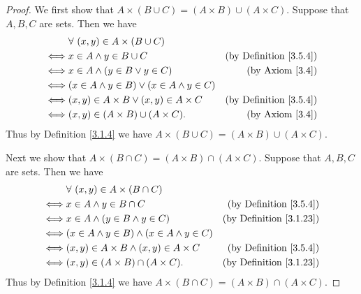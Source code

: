 \begin{proof}
    We first show that \(A \times (B \cup C) = (A \times B) \cup (A \times C)\).
    Suppose that \(A, B, C\) are sets.
    Then we have
    \begin{align*}
             & \forall\ (x, y) \in A \times (B \cup C)                                                   \\
        \iff & x \in A \land y \in B \cup C                         & \text{(by Definition \ref{3.5.4})} \\
        \iff & x \in A \land (y \in B \lor y \in C)                 & \text{(by Axiom \ref{3.4})}        \\
        \iff & (x \in A \land y \in B) \lor (x \in A \land y \in C)                                      \\
        \iff & (x, y) \in A \times B \lor (x, y) \in A \times C     & \text{(by Definition \ref{3.5.4})} \\
        \iff & (x, y) \in (A \times B) \cup (A \times C).           & \text{(by Axiom \ref{3.4})}
    \end{align*}
    Thus by Definition \ref{3.1.4} we have \(A \times (B \cup C) = (A \times B) \cup (A \times C)\).

    Next we show that \(A \times (B \cap C) = (A \times B) \cap (A \times C)\).
    Suppose that \(A, B, C\) are sets.
    Then we have
    \begin{align*}
             & \forall\ (x, y) \in A \times (B \cap C)                                                     \\
        \iff & x \in A \land y \in B \cap C                          & \text{(by Definition \ref{3.5.4})}  \\
        \iff & x \in A \land (y \in B \land y \in C)                 & \text{(by Definition \ref{3.1.23})} \\
        \iff & (x \in A \land y \in B) \land (x \in A \land y \in C)                                       \\
        \iff & (x, y) \in A \times B \land (x, y) \in A \times C     & \text{(by Definition \ref{3.5.4})}  \\
        \iff & (x, y) \in (A \times B) \cap (A \times C).            & \text{(by Definition \ref{3.1.23})}
    \end{align*}
    Thus by Definition \ref{3.1.4} we have \(A \times (B \cap C) = (A \times B) \cap (A \times C)\).


\end{proof}
